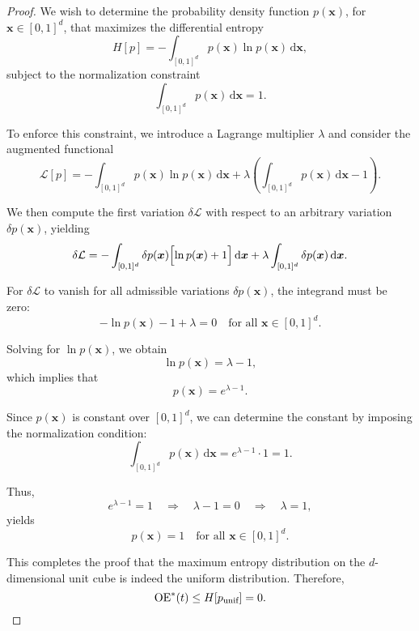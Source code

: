 \documentclass[accepted]{uai2025}
\begin{document}
\begin{proof}
We wish to determine the probability density function $p(\bm{x})$, for $\bm{x}\in[0,1]^d$, that maximizes the differential entropy
\begin{equation}
    H[p] = -\int_{[0,1]^d} p(\bm{x})\ln p(\bm{x})\,\mathrm{d}\bm{x},
\end{equation}
subject to the normalization constraint
\begin{equation}
    \int_{[0,1]^d} p(\bm{x})\,\mathrm{d}\bm{x} = 1.
\end{equation}

To enforce this constraint, we introduce a Lagrange multiplier $\lambda$ and consider the augmented functional
\begin{equation}
    \mathcal{L}[p] = -\int_{[0,1]^d} p(\bm{x})\ln p(\bm{x})\,\mathrm{d}\bm{x} + \lambda\left(\int_{[0,1]^d} p(\bm{x})\,\mathrm{d}\bm{x} - 1\right).
\end{equation}

We then compute the first variation $\delta \mathcal{L}$ with respect to an arbitrary variation $\delta p(\bm{x})$, yielding
\begin{equation}
    \delta \mathcal{L} = -\int_{[0,1]^d} \delta p(\bm{x})\Bigl[\ln p(\bm{x}) + 1\Bigr]\,\mathrm{d}\bm{x} + \lambda\int_{[0,1]^d} \delta p(\bm{x})\,\mathrm{d}\bm{x}.
\end{equation}

For $\delta \mathcal{L}$ to vanish for all admissible variations $\delta p(\bm{x})$, the integrand must be zero:
\begin{equation}
    -\ln p(\bm{x}) - 1 + \lambda = 0 \quad \text{for all } \bm{x}\in[0,1]^d.
\end{equation}

Solving for $\ln p(\bm{x})$, we obtain
\begin{equation}
    \ln p(\bm{x}) = \lambda - 1,
\end{equation}
which implies that
\begin{equation}
    p(\bm{x}) = e^{\lambda - 1}.
\end{equation}

Since $p(\bm{x})$ is constant over $[0,1]^d$, we can determine the constant by imposing the normalization condition:
\begin{equation}
    \int_{[0,1]^d} p(\bm{x})\,\mathrm{d}\bm{x} = e^{\lambda - 1} \cdot 1 = 1.
\end{equation}

Thus, 
\begin{equation}
    e^{\lambda - 1} = 1 \quad \Longrightarrow \quad \lambda - 1 = 0 \quad \Longrightarrow \quad \lambda = 1,
\end{equation}
yields
\begin{equation}
    p(\bm{x}) = 1 \quad \text{for all } \bm{x}\in[0,1]^d.
\end{equation}

This completes the proof that the maximum entropy distribution on the $d$-dimensional unit cube is indeed the uniform distribution. Therefore, 
\begin{equation}
    \textup{OE}^\ast(t) \leq H[p_\text{unif}] = 0.
\end{equation}
\end{proof}
\end{document}
